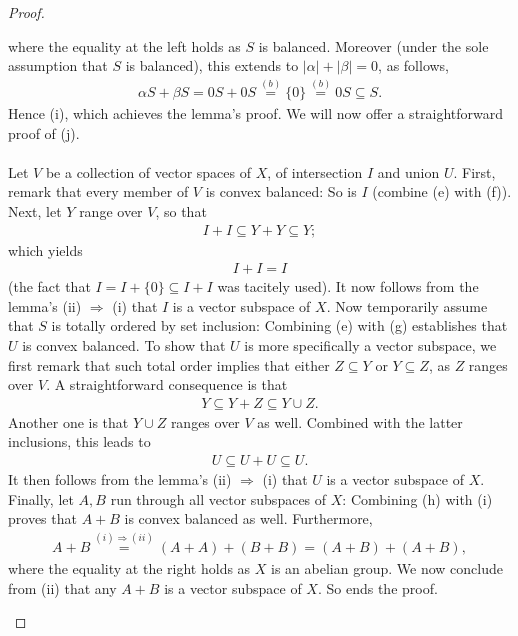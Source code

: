 \begin{proof}
\begin{enumerate}
%
where the equality at the left holds as $S$ is balanced. %
%
Moreover (under the sole assumption that $S$ is balanced), %
this extends to $|\alpha| + |\beta| = 0$, as follows, %
%
\begin{align} 
  \alpha S + \beta S  = 0S + 0S\overset{(b)}{=} \{0\} 
  \overset{(b)}{=} 0S \subseteq S.
\end{align}
%
Hence (i), which achieves the lemma's proof. %
We will now offer a straightforward proof of (j). \\
\\
Let $V$ be a collection of vector spaces of $X$, %
of intersection $I$ and union $U$. 
%
First, remark that every member of $V$ is convex balanced: %
So is $I$ (combine (e) with (f)). %
%
Next, let $\mathit{Y}$ range over $V$, so that %
%
\begin{align}
  I + I \subseteq Y + Y \subseteq  Y; 
\end{align}
%
which yields
%
\begin{align}
  I + I = I 
\end{align}
%
(the fact that $I  = I + \{0\} \subseteq I + I$ was tacitely used). %
%
It now follows from the lemma's (ii) $\Rightarrow$ (i) that %
$I$ is a vector subspace of $X$. %
%
Now temporarily assume that $S$ is totally ordered by set inclusion: %
Combining (e) with (g) establishes that $U$ is convex balanced. %
%
To show that $U$ is more specifically a vector subspace, %
we first remark that such total order implies that either %
$Z \subseteq Y$ or $Y \subseteq Z$, as $\mathit{Z}$ ranges over $V$. %
A straightforward consequence is that 
%
\begin{align}
  Y \subseteq Y + Z  \subseteq Y\cup Z.
\end{align}
%
Another one is that $Y \cup Z$ ranges over $V$ as well. %
Combined with the latter inclusions, this leads to %
%
\begin{align}
  U \subseteq U  + U \subseteq U.
\end{align}
%
It then follows from the lemma's (ii) $\Rightarrow$ (i) that %
$U$ is a vector subspace of $X$. %
%
Finally, let $\mathit{A},\mathit{B}$ run through all vector subspaces of $X$: %
Combining (h) with (i) proves that $A+B$ is convex balanced as well. %
%
Furthermore, %
%
\begin{align}
  A + B \overset{(i) \Rightarrow (ii)}{=} (A + A) + (B + B) = (A + B) + (A + B),
\end{align}
% 
where the equality at the right holds as $X$ is an abelian group. %
We now conclude from (ii) that any $A+B$ is a vector subspace of $X$. %
%
So ends the proof. %
\end{enumerate}
\end{proof}
